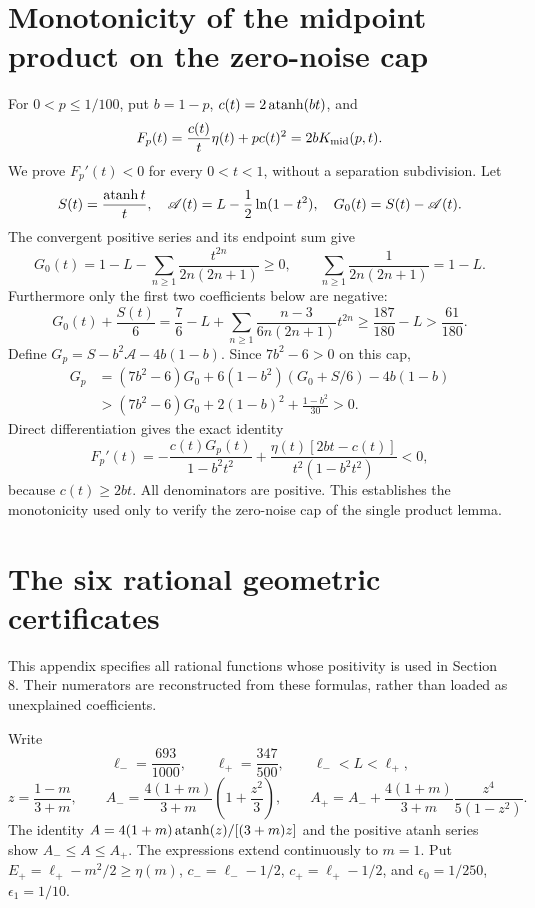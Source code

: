 \documentclass[11pt]{article}
\theoremstyle{remark}\newtheorem{remark}[theorem]{Remark}
\numberwithin{equation}{section}
\begin{document}
\section{Monotonicity of the midpoint product on the zero-noise cap}\label{app:midpoint-monotone}
For $0<p\le1/100$, put $b=1-p$, $c(t)=2\operatorname{atanh}(bt)$, and
\[
 F_p(t)=\frac{c(t)}t\eta(t)+p c(t)^2=2bK_{\rm mid}(p,t).
\]
We prove $F_p'(t)<0$ for every $0<t<1$, without a separation subdivision.
Let
\[
 S(t)=\frac{\operatorname{atanh} t}{t},\quad
 \mathscr A(t)=L-\frac12\ln(1-t^2),\quad G_0(t)=S(t)-\mathscr A(t).
\]
The convergent positive series and its endpoint sum give
\[
 G_0(t)=1-L-\sum_{n\ge1}\frac{t^{2n}}{2n(2n+1)}\ge0,
 \qquad \sum_{n\ge1}\frac1{2n(2n+1)}=1-L.
\]
Furthermore only the first two coefficients below are negative:
\[
 G_0(t)+\frac{S(t)}6
 =\frac76-L+\sum_{n\ge1}\frac{n-3}{6n(2n+1)}t^{2n}
 \ge\frac{187}{180}-L>\frac{61}{180}.
\]
Define $G_p=S-b^2\mathscr A-4b(1-b)$. Since $7b^2-6>0$ on this cap,
\begin{align*}
 G_p&=(7b^2-6)G_0+6(1-b^2)(G_0+S/6)-4b(1-b)\\
 &>(7b^2-6)G_0+2(1-b)^2+\frac{1-b^2}{30}>0.
\end{align*}
Direct differentiation gives the exact identity
\[
 F_p'(t)=-\frac{c(t)G_p(t)}{1-b^2t^2}
 +\frac{\eta(t)[2bt-c(t)]}{t^2(1-b^2t^2)}<0,
\]
because $c(t)\ge2bt$. All denominators are positive. This establishes the
monotonicity used only to verify the zero-noise cap of the single product lemma.

\section{The six rational geometric certificates}\label{app:geometry-cert}
This appendix specifies all rational functions whose positivity is used in
Section 8. Their numerators are reconstructed from these formulas, rather
than loaded as unexplained coefficients.

Write
\[
 \ell_- =\frac{693}{1000},\qquad
 \ell_+ =\frac{347}{500},\qquad
 \ell_-<L<\ell_+,
\]
\[
 z=\frac{1-m}{3+m},\qquad
 A_- =\frac{4(1+m)}{3+m}\left(1+\frac{z^2}{3}\right),\qquad
 A_+=A_-+\frac{4(1+m)}{3+m}\frac{z^4}{5(1-z^2)}.
\]
The identity $A=4(1+m)\operatorname{atanh}(z)/[(3+m)z]$ and the positive atanh series
show $A_-\le A\le A_+$. The expressions extend continuously to $m=1$.
Put $E_+=\ell_+-m^2/2\ge\eta(m)$, $c_-=\ell_--1/2$, $c_+=\ell_+-1/2$,
and $\epsilon_0=1/250$, $\epsilon_1=1/10$.
\end{document}
